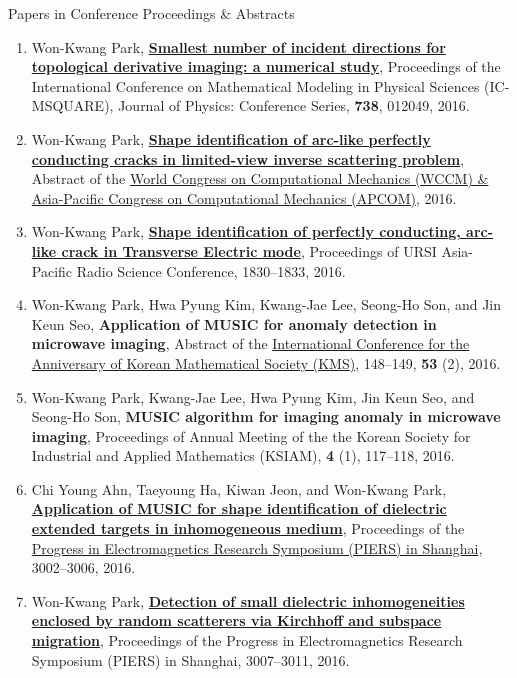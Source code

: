 \documentclass{resume} %
\begin{document}
\begin{rSection}{Papers in Conference Proceedings \& Abstracts}
\begin{enumerate}
\item\label{C-ICMSQUARE2016} Won-Kwang Park, \href{http://dx.doi.org/10.1088/1742-6596/738/1/012049}{\textbf{Smallest number of incident directions for topological derivative imaging: a numerical study}}, Proceedings of the International Conference on Mathematical Modeling in Physical Sciences (IC-MSQUARE), Journal of Physics: Conference Series, \textbf{738}, 012049, 2016.
\item\label{C-WCCM2016} Won-Kwang Park, \href{http://wccm2016.org/wp/pdf/150287.pdf}{\textbf{Shape identification of arc-like perfectly conducting cracks in limited-view inverse scattering problem}}, Abstract of the \href{http://http://wccm2016.org}{ World Congress on Computational Mechanics (WCCM) \&  Asia-Pacific Congress on Computational Mechanics (APCOM)}, 2016.
\item\label{C-URSI2016} Won-Kwang Park, \href{http://dx.doi.org/10.1109/URSIAP-RASC.2016.7601203}{\textbf{Shape identification of perfectly conducting, arc-like crack in Transverse Electric mode}}, Proceedings of URSI Asia-Pacific Radio Science Conference, 1830--1833, 2016.
\item\label{C-KMS2016} Won-Kwang Park, Hwa Pyung Kim, Kwang-Jae Lee, Seong-Ho Son, and Jin Keun Seo, \textbf{Application of MUSIC for anomaly detection in microwave imaging}, Abstract of the \href{http://www.kms.or.kr/fall2016/}{International Conference for the  Anniversary of Korean Mathematical Society (KMS)}, 148--149, \textbf{53} (2), 2016.
\item\label{C-KSIAM2016C} Won-Kwang Park, Kwang-Jae Lee, Hwa Pyung Kim, Jin Keun Seo, and Seong-Ho Son, \textbf{MUSIC algorithm for imaging anomaly in microwave imaging}, Proceedings of Annual Meeting of the the Korean Society for Industrial and Applied Mathematics (KSIAM), \textbf{4} (1), 117--118, 2016.
\item\label{C-PIERS2016A} Chi Young Ahn, Taeyoung Ha, Kiwan Jeon, and Won-Kwang Park, \href{http://dx.doi.org/10.1109/PIERS.2016.7735177}{\textbf{Application of MUSIC for shape identification of dielectric extended targets in inhomogeneous medium}}, Proceedings of the \href{http://www.piers.org/piers2016Shanghai/}{Progress in Electromagnetics Research Symposium (PIERS) in Shanghai}, 3002--3006, 2016.
\item\label{C-PIERS2016B} Won-Kwang Park, \href{http://dx.doi.org/10.1109/PIERS.2016.7735178}{\textbf{Detection of small dielectric inhomogeneities enclosed by random scatterers via Kirchhoff and subspace migration}}, Proceedings of the Progress in Electromagnetics Research Symposium (PIERS) in Shanghai, 3007--3011, 2016.

\end{enumerate}
\end{rSection}
\end{document}
